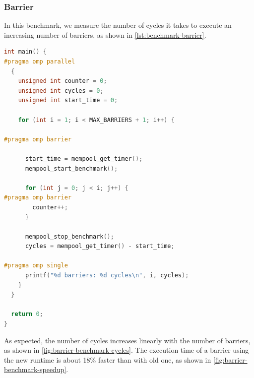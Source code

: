 \subsubsection{Barrier}

In this benchmark, we measure the number of cycles it takes to execute an increasing number of
barriers, as shown in \cref{lst:benchmark-barrier}.

\begin{lstlisting}[language=C, caption={Barrier Benchmark},
                   label={lst:benchmark-barrier}]
int main() {
#pragma omp parallel
  {
    unsigned int counter = 0;
    unsigned int cycles = 0;
    unsigned int start_time = 0;

    for (int i = 1; i < MAX_BARRIERS + 1; i++) {

#pragma omp barrier

      start_time = mempool_get_timer();
      mempool_start_benchmark();

      for (int j = 0; j < i; j++) {
#pragma omp barrier
        counter++;
      }

      mempool_stop_benchmark();
      cycles = mempool_get_timer() - start_time;

#pragma omp single
      printf("%d barriers: %d cycles\n", i, cycles);
    }
  }

  return 0;
}
\end{lstlisting}

As expected, the number of cycles increases linearly with the number of barriers, as shown in
\cref{fig:barrier-benchmark-cycles}. The execution time of a barrier using the new runtime is about
18\% faster than with old one, as shown in \cref{fig:barrier-benchmark-speedup}. 

